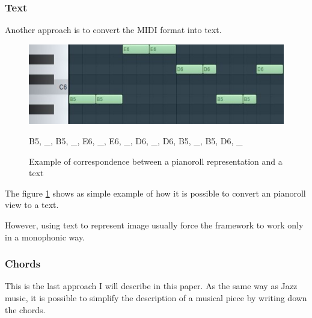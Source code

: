 \documentclass[12pt]{report}
\begin{document}
\subsubsection{Text}

Another approach is to convert the MIDI format into text. \cite{hadjeres_deepbach:_2016}

\begin{figure}[H]
   \begin{minipage}{0.5\textwidth}
     \centering
     \includegraphics[width=.9\linewidth]{images/music/pianoroll/pianoroll_small_2.jpg}
   \end{minipage}\hfill
   \begin{minipage}{0.5\textwidth}
     \centering
     B5, \_, B5, \_, E6, \_, E6, \_, D6, \_, D6, B5, \_, B5, D6, \_ 
   \end{minipage}
 \caption{Example of correspondence between a pianoroll representation and a text}
 \label{fig:pianoroll_to_text}
\end{figure}

The figure \ref{fig:pianoroll_to_text} shows as simple example of how it is possible to convert an pianoroll view to a text.

However, using text to represent image usually force the framework to work only in a monophonic way.



\subsubsection{Chords}

This is the last approach I will describe in this paper.
As the same way as Jazz music, it is possible to simplify the description of a musical piece by writing down the chords.
\end{document}
